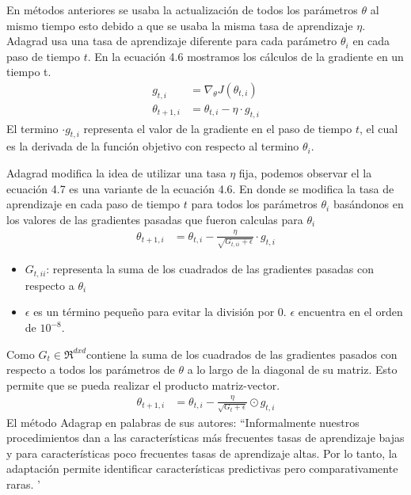 En métodos anteriores se usaba la actualización de todos los parámetros $\theta$ al mismo tiempo esto debido a que se usaba la misma tasa de aprendizaje $\eta $. Adagrad usa una tasa de aprendizaje diferente para cada parámetro $\theta_{i}$ en cada paso de tiempo $t$.
En la ecuación 4.6 mostramos los cálculos de la gradiente en un tiempo t.
\begin{equation}
\label{adagrad1}
\begin{aligned}
g_{t,i}&=\nabla_{\theta} J(\theta_{t,i})\\
\theta_{t+1,i} &= \theta_{t,i} -\eta \cdot g_{t,i}
\end{aligned}
\end{equation}
El termino $\cdot g_{t,i}$ representa el valor de la gradiente en el paso de tiempo $t$, el cual es la derivada de la función objetivo con respecto al termino $\theta_{i}$.

Adagrad modifica la idea de utilizar una tasa $\eta$ fija, podemos observar el la ecuación 4.7 es una variante de la ecuación 4.6. En donde se modifica la tasa de aprendizaje en cada paso de tiempo $t$ para todos los parámetros $\theta_{i} $ basándonos en los valores de las gradientes pasadas que fueron calculas para $\theta_{i}$
\begin{equation}
\label{adagrad2}
\begin{aligned}
\theta_{t+1,i} &= \theta_{t,i} - \frac{\eta}{\sqrt{G_{t,ii}+\epsilon}} \cdot g_{t,i}
\end{aligned}
\end{equation}

\begin{itemize}
	\item $G_{t,ii}$: representa la suma de los cuadrados de las gradientes pasadas con respecto a $\theta_{i}$
	\item $\epsilon $ es un término pequeño para evitar la división por 0. $\epsilon$ encuentra en el orden de $10^{-8}$.
\end{itemize}
Como $G_{t} \in \Re^{dxd} $contiene la suma de los cuadrados de las gradientes pasados con respecto a todos los parámetros de $\theta$ a lo largo de la diagonal de su matriz. Esto permite que se pueda realizar el producto matriz-vector.
\begin{equation}
\label{adagrad3}
\begin{aligned}
\theta_{t+1,i} &= \theta_{t,i} - \frac{\eta}{\sqrt{G_{t}+\epsilon}} \odot g_{t,i}
\end{aligned}
\end{equation}
El método Adagrap en palabras de sus autores:
\textquotedblleft Informalmente nuestros procedimientos dan a las características más frecuentes tasas de aprendizaje bajas y para características poco frecuentes tasas de aprendizaje altas. Por lo tanto, la adaptación permite identificar características predictivas pero comparativamente raras. \textquoteright  \cite{ADA} 

